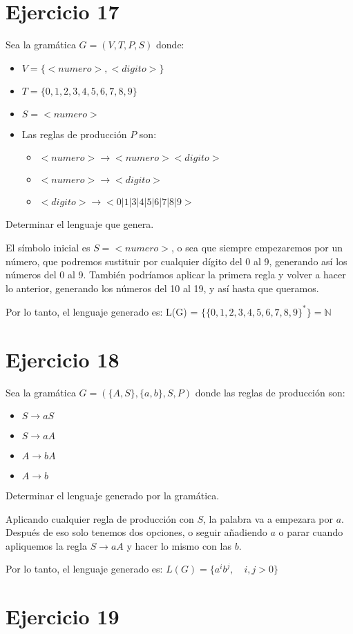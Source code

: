 \documentclass[a4paper, 11pt]{article}
\begin{document}
\section*{Ejercicio 17}
Sea la gramática $G=(V,T,P,S)$ donde:
\begin{itemize}
\item $V=\{<numero>, <digito>\}$
\item $T = \{0,1,2,3,4,5,6,7,8,9\}$
\item $S=<numero>$
\item Las reglas de producción $P$ son:
\begin{itemize}
\item $<numero> \longrightarrow <numero><digito>$
\item $<numero> \longrightarrow <digito>$
\item $<digito> \longrightarrow <0|1|3|4|5|6|7|8|9>$
\end{itemize}
\end{itemize}
Determinar el lenguaje que genera.

El símbolo inicial es $S=<numero>$, o sea que siempre empezaremos por un número, que podremos sustituir por cualquier dígito del 0 al 9, generando así los números del 0 al 9. También podríamos aplicar la primera regla y volver a hacer lo anterior, generando los números del 10 al 19, y así hasta que queramos.

Por lo tanto, el lenguaje generado es: L(G) = $\{\{0,1,2,3,4,5,6,7,8,9\}^*\}=\mathbb{N}$
\section*{Ejercicio 18}
Sea la gramática $G=(\{A,S\},\{a,b\},S,P)$ donde las reglas de producción son:
\begin{itemize}
\item $S \longrightarrow aS$
\item $S \longrightarrow aA$
\item $A \longrightarrow bA$
\item $A \longrightarrow b$
\end{itemize}
Determinar el lenguaje generado por la gramática.

Aplicando cualquier regla de producción con $S$, la palabra va a empezara por $a$. Después de eso solo tenemos dos opciones, o seguir añadiendo $a$ o parar cuando apliquemos la regla $S\longrightarrow aA$ y hacer lo mismo con las $b$.

Por lo tanto, el lenguaje generado es: $L(G) = \{a^ib^j,\quad i,j>0\}$
\section*{Ejercicio 19}
\end{document}

